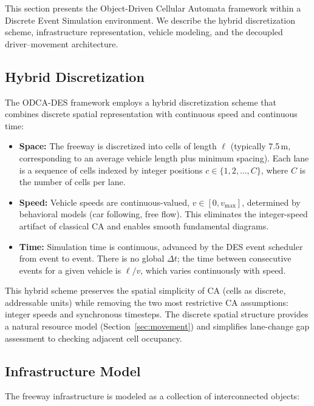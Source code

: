 \documentclass[review,authoryear]{elsarticle}
\begin{document}
This section presents the Object-Driven Cellular Automata framework within a Discrete Event Simulation environment. We describe the hybrid discretization scheme, infrastructure representation, vehicle modeling, and the decoupled driver--movement architecture.

\subsection{Hybrid Discretization}
\label{sec:discretization}

The ODCA-DES framework employs a hybrid discretization scheme that combines discrete spatial representation with continuous speed and continuous time:

\begin{itemize}
    \item \textbf{Space:} The freeway is discretized into cells of length $\ell$ (typically 7.5\,m, corresponding to an average vehicle length plus minimum spacing). Each lane is a sequence of cells indexed by integer positions $c \in \{1, 2, \ldots, C\}$, where $C$ is the number of cells per lane.

    \item \textbf{Speed:} Vehicle speeds are continuous-valued, $v \in [0, v_{\max}]$, determined by behavioral models (car following, free flow). This eliminates the integer-speed artifact of classical CA and enables smooth fundamental diagrams.

    \item \textbf{Time:} Simulation time is continuous, advanced by the DES event scheduler from event to event. There is no global $\Delta t$; the time between consecutive events for a given vehicle is $\ell / v$, which varies continuously with speed.
\end{itemize}

This hybrid scheme preserves the spatial simplicity of CA (cells as discrete, addressable units) while removing the two most restrictive CA assumptions: integer speeds and synchronous timesteps. The discrete spatial structure provides a natural resource model (Section~\ref{sec:movement}) and simplifies lane-change gap assessment to checking adjacent cell occupancy.

\subsection{Infrastructure Model}
\label{sec:infrastructure}

The freeway infrastructure is modeled as a collection of interconnected objects:
\end{document}
